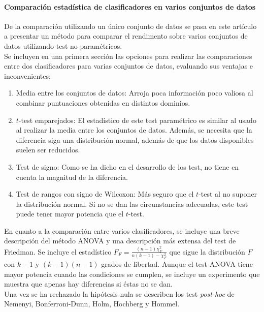 \paragraph{Comparación estadística de clasificadores en 
varios conjuntos de datos} \cite{DBLP:journals/jmlr/Demsar06} De la comparación 
utilizando un único conjunto de datos se pasa en este 
artículo a presentar un método para comparar el rendimento 
sobre varios conjuntos de datos utilizando test no 
paramétricos.\\
	Se incluyen en una primera sección las opciones para 
realizar las comparaciones entre dos clasificadores para 
varias conjuntos de datos, evaluando sus ventajas e 
inconvenientes:
	\begin{enumerate}
	\item Media entre los conjuntos de datos: Arroja poca 
		información poco valiosa al combinar puntuaciones 
		obtenidas en distintos dominios.
	\item $t$-test emparejados: El estadístico de este test 
		paramétrico es similar al usado al realizar la media 
		entre los conjuntos de datos. Además, se necesita que 
		la diferencia siga una distribución normal, además de 
		que los datos disponibles suelen ser reducidos. 
	\item Test de signo: Como se ha dicho en el desarrollo de 
		los test, no tiene en cuenta la magnitud de la 
		diferencia.
	\item Test de rangos con signo de Wilcoxon: Más seguro 
		que el $t$-test al no suponer la distribución normal. 
		Si no se dan las circunstancias adecuadas, este test 
		puede tener mayor potencia que el $t$-test.
	\end{enumerate}
	
	En cuanto a la comparación entre varios clasificadores, 
se incluye una breve descripción del método ANOVA y una 
descripción más extensa del test de Friedman. Se incluye el 
estadístico $F_F = \frac{(n-1) \chi^2_F}{n(k-1) - \chi^2_F}$ 
que sigue la distribución $F$ con $k-1$ y $(k-1)(n-1)$ grados 
de libertad. Aunque el test ANOVA tiene mayor potencia cuando 
las condiciones se cumplen, se incluye un experimento que 
muestra que apenas hay diferencias si éstas no se dan.\\

	Una vez se ha rechazado la hipótesis nula se describen 
los test \textit{post-hoc} de Nemenyi, Bonferroni-Dunn, Holm, 
Hochberg y Hommel.
	
	
